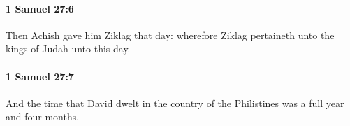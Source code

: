 		\paragraph{1 Samuel 27:6} %
			\label{1SAMUEL-27-6}

			Then Achish gave him Ziklag that day: wherefore Ziklag pertaineth unto the kings of Judah unto this day.


		\paragraph{1 Samuel 27:7} %
			\label{1SAMUEL-27-7}

			And the time that David dwelt in the country of the Philistines was a full year and four months.


